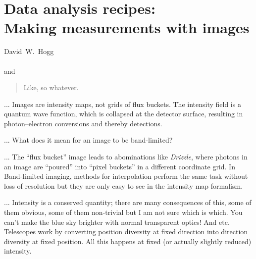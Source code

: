 \documentclass[12pt,twoside,pdftex]{article}
\begin{document}
\thispagestyle{plain}\raggedbottom
\section*{Data analysis recipes:\\
  Making measurements with images\footnotemark}


\noindent
David~W.~Hogg\\
\\
and~

\begin{abstract}
Like, so whatever.
\end{abstract}

... Images are intensity maps, not grids of flux buckets.  The
intensity field is a quantum wave function, which is collapsed at the
detector surface, resulting in photon--electron conversions and
thereby detections.

... What does it mean for an image to be band-limited?

... The ``flux bucket'' image leads to abominations like
\textsl{Drizzle}, where photons in an image are ``poured'' into
``pixel buckets'' in a different coordinate grid.  In Band-limited
imaging, methods for interpolation perform the same task without loss
of resolution but they are only easy to see in the intensity map
formalism.

... Intensity is a conserved quantity; there are many consequences of
this, some of them obvious, some of them non-trivial but I am not sure
which is which.  You can't make the blue sky brighter with normal
transparent optics!  And etc.  Telescopes work by converting position
diversity at fixed direction into direction diversity at fixed
position.  All this happens at fixed (or actually slightly reduced)
intensity.
\end{document}
